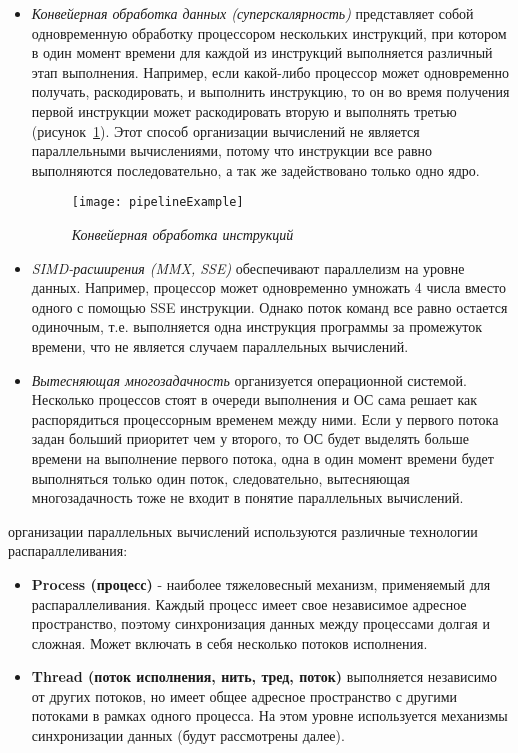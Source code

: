 {\begin{itemize}
			\item\textit{Конвейерная обработка данных (суперскалярность)} представляет собой одновременную обработку процессором нескольких инструкций, при котором в один момент времени для каждой из инструкций выполняется различный этап выполнения. Например, если какой-либо процессор может одновременно получать, раскодировать, и выполнить инструкцию, то он во время получения первой инструкции может раскодировать вторую и выполнять третью (рисунок~\ref{pipelineExample:image}). Этот способ организации вычислений не является параллельными вычислениями, потому что инструкции все равно выполняются последовательно, а так же задействовано только одно ядро.
				\begin{figure}[H]
					\texttt{[image: pipelineExample]}
					\caption{\textit{Конвейерная обработка инструкций}}
					\label{pipelineExample:image}
				\end{figure}
			\item\textit{SIMD-расширения (MMX, SSE)} обеспечивают параллелизм на уровне данных. Например, процессор может одновременно умножать 4 числа вместо одного с помощью SSE инструкции. Однако поток команд все равно остается одиночным, т.е. выполняется одна инструкция программы за промежуток времени, что не является случаем параллельных вычислений.
			\item\textit{Вытесняющая многозадачность} организуется операционной системой. Несколько процессов стоят в очереди выполнения и ОС сама решает как распорядиться процессорным временем между ними. Если у первого потока задан больший приоритет чем у второго, то ОС будет выделять больше времени на выполнение первого потока, одна в один момент времени будет выполняться только один поток, следовательно, вытесняющая многозадачность тоже не входит в понятие параллельных вычислений.
		\end{itemize}
	 организации параллельных вычислений используются различные технологии распараллеливания:
		\begin{itemize}
			\item\textbf{Process (процесс)} - наиболее тяжеловесный механизм, применяемый для распараллеливания. Каждый процесс имеет свое независимое адресное пространство, поэтому синхронизация данных между процессами долгая и сложная. Может включать в себя несколько потоков исполнения.
			\item\textbf{Thread (поток исполнения, нить, тред, поток)} выполняется независимо от других потоков, но имеет общее адресное пространство с другими потоками в рамках одного процесса. На этом уровне используется механизмы синхронизации данных (будут рассмотрены далее).

\end{itemize}}
